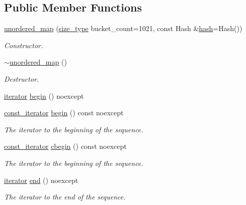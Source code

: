 \subsection*{Public Member Functions}
\begin{DoxyCompactItemize}
\item 
\hyperlink{classshad_1_1unordered__map_acd64334034dd1af3a1cc39f3b62fc622}{unordered\-\_\-map} (\hyperlink{group__Types_ga2a84980e6d435a8a7b1a99f78b828a65}{size\-\_\-type} bucket\-\_\-count=1021, const Hash \&\hyperlink{structshad_1_1hash}{hash}=Hash())
\begin{DoxyCompactList}\small\item\em Constructor. \end{DoxyCompactList}\item 
\hyperlink{classshad_1_1unordered__map_a3964d9033e56109fbbcabdf565c2d8a9}{$\sim$unordered\-\_\-map} ()
\begin{DoxyCompactList}\small\item\em Destructor. \end{DoxyCompactList}\item 
\hyperlink{group__Types_gab52d604c26835c20a0363f9affa7ff57}{iterator} \hyperlink{group__Iterators_gad6f6e325f3b1ce921af1e410dbfe9710}{begin} () noexcept
\item 
\hyperlink{group__Types_ga102c3cd521767bf4b22f3788ccc054e8}{const\-\_\-iterator} \hyperlink{group__Iterators_ga64e3e05b7d2e44f6996b32ac84722bc0}{begin} () const noexcept
\begin{DoxyCompactList}\small\item\em The iterator to the beginning of the sequence. \end{DoxyCompactList}\item 
\hyperlink{group__Types_ga102c3cd521767bf4b22f3788ccc054e8}{const\-\_\-iterator} \hyperlink{group__Iterators_ga8d91fc63376329a528ac21d618efafb5}{cbegin} () const noexcept
\begin{DoxyCompactList}\small\item\em The iterator to the beginning of the sequence. \end{DoxyCompactList}\item 
\hyperlink{group__Types_gab52d604c26835c20a0363f9affa7ff57}{iterator} \hyperlink{group__Iterators_ga34c20916fffb91405b135133803b69f9}{end} () noexcept
\begin{DoxyCompactList}\small\item\em The iterator to the end of the sequence. \end{DoxyCompactList}\item 

\end{DoxyCompactItemize}
